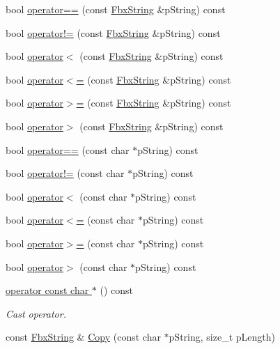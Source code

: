 \begin{DoxyCompactItemize}
\item 
bool \hyperlink{class_fbx_string_aafbaa4e17d510d9027431cc94ac383ce}{operator==} (const \hyperlink{class_fbx_string}{Fbx\+String} \&p\+String) const
\item 
bool \hyperlink{class_fbx_string_a882e2129d8e793e6594260e748db5553}{operator!=} (const \hyperlink{class_fbx_string}{Fbx\+String} \&p\+String) const
\item 
bool \hyperlink{class_fbx_string_a96940463f18a845a15580a1b90890677}{operator$<$} (const \hyperlink{class_fbx_string}{Fbx\+String} \&p\+String) const
\item 
bool \hyperlink{class_fbx_string_a6154ef9580e5cc38e8672f28834c6540}{operator$<$=} (const \hyperlink{class_fbx_string}{Fbx\+String} \&p\+String) const
\item 
bool \hyperlink{class_fbx_string_a8e6107be9189058c44856cc971152f65}{operator$>$=} (const \hyperlink{class_fbx_string}{Fbx\+String} \&p\+String) const
\item 
bool \hyperlink{class_fbx_string_ae21fb26fd94ff4ba33d0fc181d26c807}{operator$>$} (const \hyperlink{class_fbx_string}{Fbx\+String} \&p\+String) const
\item 
bool \hyperlink{class_fbx_string_a292bdfc5c4bd13a7dd05c3660974f7d6}{operator==} (const char $\ast$p\+String) const
\item 
bool \hyperlink{class_fbx_string_acbf3d5ae883d8a17d61b316c420fc94b}{operator!=} (const char $\ast$p\+String) const
\item 
bool \hyperlink{class_fbx_string_a690101be9e73d2296074a688646c9619}{operator$<$} (const char $\ast$p\+String) const
\item 
bool \hyperlink{class_fbx_string_ab20ec27bf61855ed5906220fd4f9e4d4}{operator$<$=} (const char $\ast$p\+String) const
\item 
bool \hyperlink{class_fbx_string_ace37c7b32e99f8c7099014058870d4d6}{operator$>$=} (const char $\ast$p\+String) const
\item 
bool \hyperlink{class_fbx_string_a67a9187d6ea2ee056a2d1b6acac6ad03}{operator$>$} (const char $\ast$p\+String) const
\item 
\hyperlink{class_fbx_string_a53f82ee512ae5c6f17a3907c1373d62e}{operator const char $\ast$} () const
\begin{DoxyCompactList}\small\item\em Cast operator. \end{DoxyCompactList}\item 
const \hyperlink{class_fbx_string}{Fbx\+String} \& \hyperlink{class_fbx_string_ae9461ab3157982b492e02fec9b5503fa}{Copy} (const char $\ast$p\+String, size\+\_\+t p\+Length)

\end{DoxyCompactItemize}

